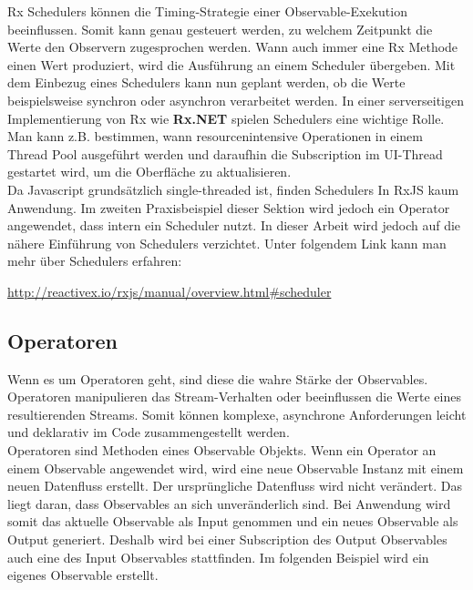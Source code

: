 Rx Schedulers können die Timing-Strategie einer Observable-Exekution beeinflussen. Somit kann genau gesteuert werden, zu welchem Zeitpunkt die Werte den Observern zugesprochen werden. Wann auch immer eine Rx Methode einen Wert produziert, wird die Ausführung an einem Scheduler übergeben. Mit dem Einbezug eines Schedulers kann nun geplant werden, ob die Werte beispielsweise synchron oder asynchron verarbeitet werden. In einer serverseitigen Implementierung von Rx wie \textbf{Rx.NET} spielen Schedulers eine wichtige Rolle. Man kann z.B. bestimmen, wann resourcenintensive Operationen in einem Thread Pool ausgeführt werden und daraufhin die Subscription im UI-Thread gestartet wird, um die Oberfläche zu aktualisieren\cite{rx-schedulers}.\\

\noindent
Da Javascript grundsätzlich single-threaded ist, finden Schedulers In RxJS kaum Anwendung. Im zweiten Praxisbeispiel dieser Sektion wird jedoch ein Operator angewendet, dass intern ein Scheduler nutzt. In dieser Arbeit wird jedoch auf die nähere Einführung von Schedulers verzichtet. Unter folgendem Link kann man mehr über Schedulers erfahren:

\begin{center}
    \url{http://reactivex.io/rxjs/manual/overview.html#scheduler}
\end{center}

\subsection{Operatoren}

Wenn es um Operatoren geht, sind diese die wahre Stärke der Observables. Operatoren manipulieren das Stream-Verhalten oder beeinflussen die Werte eines resultierenden Streams. Somit können komplexe, asynchrone Anforderungen leicht und deklarativ im Code zusammengestellt werden.\\

\noindent
Operatoren sind Methoden eines Observable Objekts. Wenn ein Operator an einem Observable angewendet wird, wird eine neue Observable Instanz mit einem neuen Datenfluss erstellt. Der ursprüngliche Datenfluss wird nicht verändert. Das liegt daran, dass Observables an sich unveränderlich sind. Bei Anwendung wird somit das aktuelle Observable als Input genommen und ein neues Observable als Output generiert. Deshalb wird bei einer Subscription des Output Observables auch eine des Input Observables stattfinden. Im folgenden Beispiel wird ein eigenes Observable erstellt.

